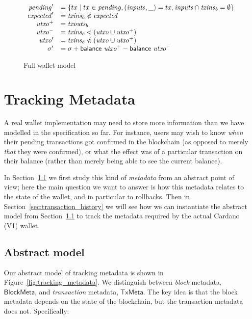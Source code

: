 \documentclass{article}
\newcommand{\restrictdom}{\lhd}
\newcommand{\subtractdom}{\mathbin{\slashed{\restrictdom}}}
\numberwithin{equation}{lemma}
\begin{document}
\begin{figure}
\begin{align*}
   \begin{array}[t]{rl}
     \mathit{pending}'  & = \{ tx \mid tx \in \mathit{pending}, (\mathit{inputs}, \_) = tx, \mathit{inputs} \cap \mathit{txins}_b = \emptyset \} \\
     \mathit{expected}' & = \mathit{txins}_b \subtractdom \mathit{expected} \\
     \mathit{utxo}^+    & = \mathit{txouts}_b \\
     \mathit{utxo}^-    & = \mathit{txins}_b \restrictdom (\mathit{utxo} \cup \mathit{utxo}^+) \\
     \mathit{utxo}'     & = \mathit{txins}_b \subtractdom (\mathit{utxo} \cup \mathit{utxo}^+) \\
     \sigma'            & = \sigma + \mathsf{balance} ~ \mathit{utxo}^+ - \mathsf{balance} ~ \mathit{utxo}^-
   \end{array}
\end{align*}

\caption{\label{fig:full_wallet_model}Full wallet model}
\end{figure}

\section{Tracking Metadata}

A real wallet implementation may need to store more information than
we have modelled in the specification so far. For instance, users may wish to
know \emph{when} their pending transactions got confirmed in the blockchain
(as opposed to merely \emph{that} they were confirmed), or what the effect
was of a particular transaction on their balance (rather than merely being
able to see the current balance).

In Section~\ref{sec:abstract_metadata} we first study this kind of \emph{metadata}
from an abstract point of view; here the main question we want to answer is
how this metadata relates to the state of the wallet, and in particular to
rollbacks. Then in Section~\ref{sec:transaction_history} we will see how
we can instantiate the abstract model from Section~\ref{sec:abstract_metadata}
to track the metadata required by the actual Cardano (V1) wallet.

\subsection{Abstract model}
\label{sec:abstract_metadata}

Our abstract model of tracking metadata is shown in
Figure~\ref{fig:tracking_metadata}. We distinguish between \emph{block}
metadata, $\mathsf{BlockMeta}$, and \emph{transaction} metadata,
$\mathsf{TxMeta}$. The key idea is that the block metadata depends on the
state of the blockchain, but the transaction metadata does not. Specifically:
\end{document}
